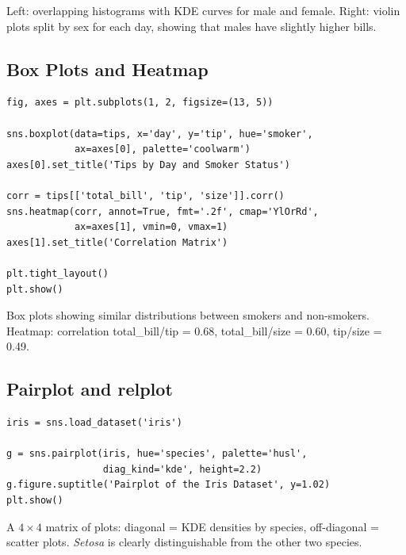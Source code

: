\begin{codeoutput}
Left: overlapping histograms with KDE curves for male and female. Right: violin plots split by sex for each day, showing that males have slightly higher bills.
\end{codeoutput}

\subsection{Box Plots and Heatmap}

\begin{codeblock}[title=\textbf{Python}]
\begin{verbatim}
fig, axes = plt.subplots(1, 2, figsize=(13, 5))

sns.boxplot(data=tips, x='day', y='tip', hue='smoker',
            ax=axes[0], palette='coolwarm')
axes[0].set_title('Tips by Day and Smoker Status')

corr = tips[['total_bill', 'tip', 'size']].corr()
sns.heatmap(corr, annot=True, fmt='.2f', cmap='YlOrRd',
            ax=axes[1], vmin=0, vmax=1)
axes[1].set_title('Correlation Matrix')

plt.tight_layout()
plt.show()
\end{verbatim}
\end{codeblock}

\begin{codeoutput}
Box plots showing similar distributions between smokers and non-smokers. Heatmap: correlation total\_bill/tip = 0.68, total\_bill/size = 0.60, tip/size = 0.49.
\end{codeoutput}

\subsection{Pairplot and relplot}

\begin{codeblock}[title=\textbf{Python}]
\begin{verbatim}
iris = sns.load_dataset('iris')

g = sns.pairplot(iris, hue='species', palette='husl',
                 diag_kind='kde', height=2.2)
g.figure.suptitle('Pairplot of the Iris Dataset', y=1.02)
plt.show()
\end{verbatim}
\end{codeblock}

\begin{codeoutput}
A $4 \times 4$ matrix of plots: diagonal = KDE densities by species, off-diagonal = scatter plots. \emph{Setosa} is clearly distinguishable from the other two species.
\end{codeoutput}

